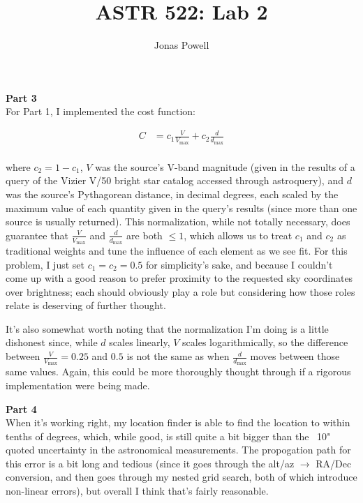 \documentclass[12pt]{article}
\begin{document}
\title{\textbf{ASTR 522: Lab 2}}
\author{Jonas Powell}
\maketitle


\begin{onehalfspacing}


\iffalse
For part 1, describe the methodology you used to determine most probable astronomical source.
\fi
\raggedright{\textbf{\Large Part 3}}\\

For Part 1, I implemented the cost function:

\begin{align*}
  C &= c_1 \frac{V}{V_{\text{max}}} + c_2 \frac{d}{d_{\text{max}}} \\
\end{align*}

where $c_2 = 1 - c_1$, $V$ was the source's V-band magnitude (given in the results of a query of the Vizier V/50 bright star catalog accessed through astroquery), and $d$ was the source's Pythagorean distance, in decimal degrees, each scaled by the maximum value of each quantity given in the query's results (since more than one source is usually returned). This normalization, while not totally necessary, does guarantee that $\frac{V}{V_{\text{max}}}$ and $\frac{d}{d_{\text{max}}}$ are both $\leq 1$, which allows us to treat $c_1$ and $c_2$ as traditional weights and tune the influence of each element as we see fit. For this problem, I just set $c_1 = c_2 = 0.5$ for simplicity's sake, and because I couldn't come up with a good reason to prefer proximity to the requested sky coordinates over brightness; each should obviously play a role but considering how those roles relate is deserving of further thought. \bigskip

It's also somewhat worth noting that the normalization I'm doing is a little dishonest since, while $d$ scales linearly, $V$ scales logarithmically, so the difference between $\frac{V}{V_{\text{max}}} = 0.25$ and $0.5$ is not the same as when $\frac{d}{d_{\text{max}}}$ moves between those same values. Again, this could be more thoroughly thought through if a rigorous implementation were being made.
\bigskip \bigskip



\iffalse
For part 2, how does the uncertainty in your geographic position compare with the uncertainty in astronomical coordinates from the previous problem? 
\fi
\raggedright{\textbf{\Large Part 4}}\\
When it's working right, my location finder is able to find the location to within tenths of degrees, which, while good, is still quite a bit bigger than the ~10" quoted uncertainty in the astronomical measurements. The propogation path for this error is a bit long and tedious (since it goes through the alt/az $\rightarrow$ RA/Dec conversion, and then goes through my nested grid search, both of which introduce non-linear errors), but overall I think that's fairly reasonable.







\bigskip
\bigskip
\end{onehalfspacing}
\end{document}
